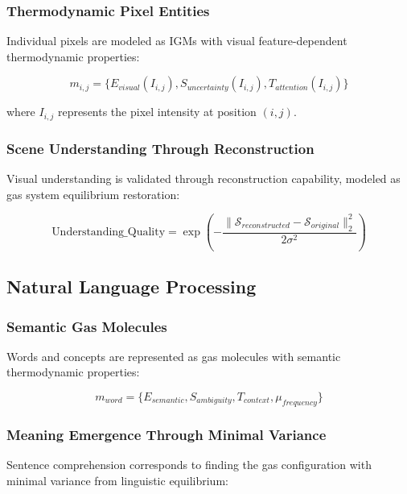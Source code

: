 \documentclass[11pt,a4paper]{article}
\begin{document}
\subsubsection{Thermodynamic Pixel Entities}

Individual pixels are modeled as IGMs with visual feature-dependent thermodynamic properties:

\begin{equation}
m_{i,j} = \{E_{visual}(I_{i,j}), S_{uncertainty}(I_{i,j}), T_{attention}(I_{i,j})\}
\end{equation}

where $I_{i,j}$ represents the pixel intensity at position $(i,j)$.

\subsubsection{Scene Understanding Through Reconstruction}

Visual understanding is validated through reconstruction capability, modeled as gas system equilibrium restoration:

\begin{equation}
\text{Understanding\_Quality} = \exp\left(-\frac{\|\mathcal{S}_{reconstructed} - \mathcal{S}_{original}\|_2^2}{2\sigma^2}\right)
\end{equation}

\subsection{Natural Language Processing}

\subsubsection{Semantic Gas Molecules}

Words and concepts are represented as gas molecules with semantic thermodynamic properties:

\begin{equation}
m_{word} = \{E_{semantic}, S_{ambiguity}, T_{context}, \mu_{frequency}\}
\end{equation}

\subsubsection{Meaning Emergence Through Minimal Variance}

Sentence comprehension corresponds to finding the gas configuration with minimal variance from linguistic equilibrium:
\end{document}
